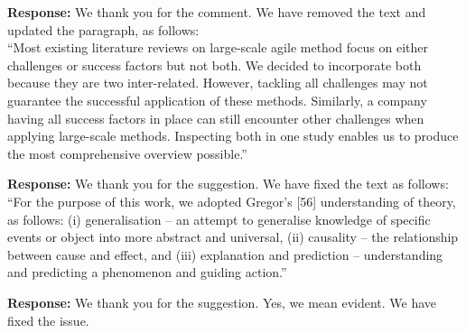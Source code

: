 \documentclass[a4paper,twoside,11pt]{reviewresponse}
\begin{document}
\textbf{Response:}
We thank you for the comment. We have removed the text and updated the paragraph, as follows:\\
``Most existing literature reviews on large-scale agile method focus on either challenges or success factors but not both. We decided to incorporate both because they are two inter-related. However, tackling all challenges may not guarantee the successful application of these methods. Similarly, a company having all success factors in place can still encounter other challenges when applying large-scale methods. Inspecting both in one study enables us to produce the most comprehensive overview possible.''

\textbf{Response:}
We thank you for the suggestion. We have fixed the text as follows:\\
``For the purpose of this work, we adopted Gregor's [56] understanding of theory, as follows: (i) generalisation -- an attempt to generalise knowledge of specific events or object into more abstract and universal, (ii) causality -- the relationship between cause and effect, and (iii) explanation and prediction -- understanding and predicting a phenomenon and guiding action.''

\textbf{Response:}
We thank you for the suggestion. Yes, we mean evident. We have fixed the issue.
\end{document}
